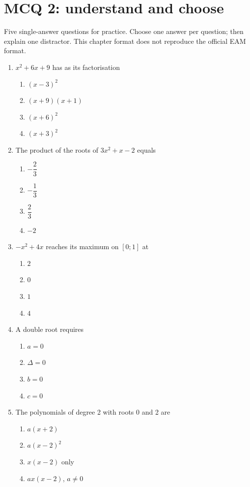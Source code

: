 \endgroup
\begingroup\small
{}\section*{MCQ 2: understand and choose}\label{C02-Q2}
Five single-answer questions for practice. Choose one answer per question; then explain one distractor. This chapter format does not reproduce the official EAM format.
\begin{enumerate}
\item $x^2+6x+9$ has as its factorisation
\begin{enumerate}[label=\Alph*.,itemsep=2pt]
\item $(x-3)^2$
\item $(x+9)(x+1)$
\item $(x+6)^2$
\item $(x+3)^2$
\end{enumerate}
\item The product of the roots of $3x^2+x-2$ equals
\begin{enumerate}[label=\Alph*.,itemsep=2pt]
\item $-\dfrac{2}{3}$
\item $-\dfrac{1}{3}$
\item $\dfrac{2}{3}$
\item $-2$
\end{enumerate}
\item $-x^2+4x$ reaches its maximum on $[0;1]$ at
\begin{enumerate}[label=\Alph*.,itemsep=2pt]
\item $2$
\item $0$
\item $1$
\item $4$
\end{enumerate}
\item A double root requires
\begin{enumerate}[label=\Alph*.,itemsep=2pt]
\item $a=0$
\item $\Delta=0$
\item $b=0$
\item $c=0$
\end{enumerate}
\item The polynomials of degree 2 with roots 0 and 2 are
\begin{enumerate}[label=\Alph*.,itemsep=2pt]
\item $a(x+2)$
\item $a(x-2)^2$
\item $x(x-2)$ only
\item $ax(x-2)$, $a\ne0$
\end{enumerate}
\end{enumerate}
